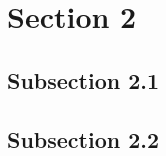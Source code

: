 \section{Section 2}
\label{sec:problem_description}
\subsection{Subsection 2.1}
\subsection{Subsection 2.2}

\FloatBarrier
